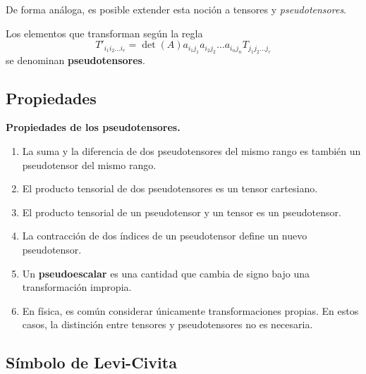 De forma análoga, es posible extender esta noción a tensores y \emph{pseudotensores}.

\begin{defi} 
    Los elementos que transforman según la regla
    \begin{equation}
        T'_{i_1 i_2 \dots i_r} = \det(A) a_{i_1 j_1} a_{i_2 j_2} \dots a_{i_n j_n} T_{j_1 j_2 \dots j_r} 
    \end{equation}
    se denominan \textbf{pseudotensores}.
\end{defi}

\subsection{Propiedades}

\begin{propiedad}
    \textbf{Propiedades de los pseudotensores.}

    \begin{enumerate}
        \item La suma y la diferencia de dos pseudotensores del mismo rango es también un pseudotensor del mismo rango.
        \item El producto tensorial de dos pseudotensores es un tensor cartesiano.
        \item El producto tensorial de un pseudotensor y un tensor es un pseudotensor.
        \item La contracción de dos índices de un pseudotensor define un nuevo pseudotensor.
        \item Un \textbf{pseudoescalar} es una cantidad que cambia de signo bajo una transformación impropia.
        \item En física, es común considerar únicamente transformaciones propias. En estos casos, la distinción entre tensores y pseudotensores no es necesaria.
    \end{enumerate}
\end{propiedad}

\subsection{Símbolo de Levi-Civita}

